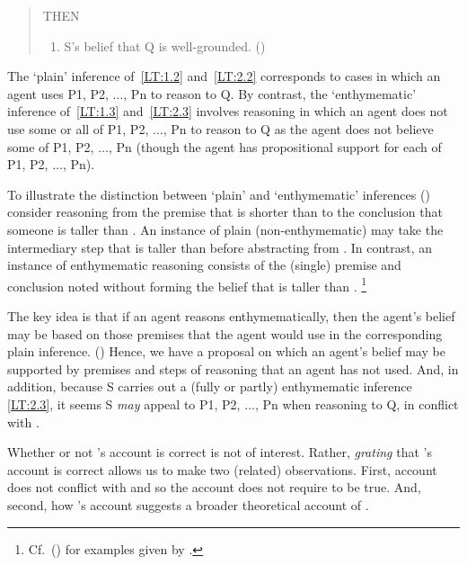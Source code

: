 \begin{note}
\begin{quote}
    THEN
    \begin{enumerate}[label=(3)]
    \item S's belief that Q is well-grounded.\nolinebreak
      \mbox{}\hfill\mbox{(\Citeyear[87]{Moretti:2019wx})}
    \end{enumerate}
  \end{quote}

  The `plain' inference of~\ref{LT:1.2} and~\ref{LT:2.2} corresponds to cases in which an agent uses P1, P2, \(\dots\), Pn to reason to Q.
  By contrast, the `enthymematic' inference of~\ref{LT:1.3} and~\ref{LT:2.3} involves reasoning in which an agent does not use some or all of P1, P2, \(\dots\), Pn to reason to Q as the agent does not believe some of P1, P2, \(\dots\), Pn (though the agent has propositional support for each of P1, P2, \(\dots\), Pn).

  To illustrate the distinction between `plain' and `enthymematic' inferences (\Citeyear[Cf.][85]{Moretti:2019wx}) consider reasoning from the premise that  is shorter than  to the conclusion that someone is taller than .
  An instance of plain (non-enthymematic) may take the intermediary step that  is taller than  before abstracting from .
  In contrast, an instance of enthymematic reasoning consists of the (single) premise and conclusion noted without forming the belief that  is taller than .\nolinebreak
  \footnote{Cf.\ (\Citeyear[87--89]{Moretti:2019wx}) for examples given by \citeauthor{Moretti:2019wx}.}

  The key idea is that if an agent reasons enthymematically, then the agent's belief may be based on those premises that the agent would use in the corresponding plain inference.
  (\Citeyear[Cf.][86--87]{Moretti:2019wx})
  Hence, we have a proposal on which an agent's belief may be supported by premises and steps of reasoning that an agent has not used.
  And, in addition, because S carries out a (fully or partly) enthymematic inference \ref{LT:2.3}, it seems S \emph{may} appeal to P1, P2, \(\dots\), Pn when reasoning to Q, in conflict with \ESU{}.

  Whether or not \citeauthor{Moretti:2019wx}'s account is correct is not of interest.
  Rather, \emph{grating} that \citeauthor{Moretti:2019wx}'s account is correct allows us to make two (related) observations.
  First, \citeauthor{Moretti:2019wx} account does not conflict with \ESU{} and so the account does not require \EAS{} to be true.
  And, second, how \citeauthor{Moretti:2019wx}'s account suggests a broader theoretical account of \EAS{}.
\end{note}

